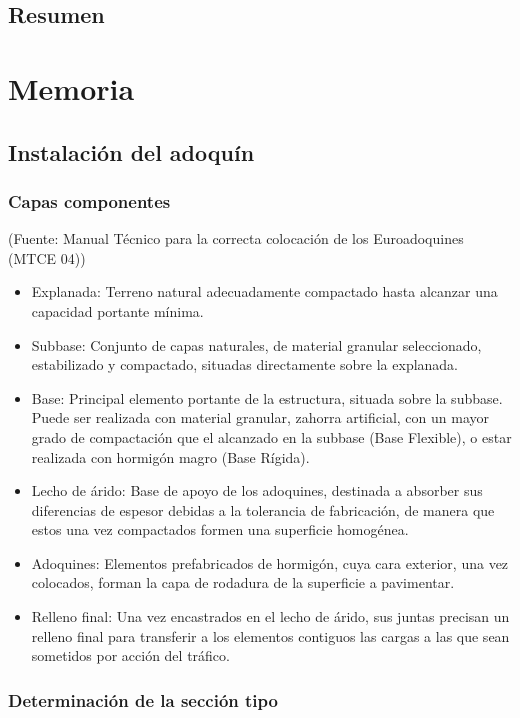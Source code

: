 \documentclass[12pt,titlepage,openright]{report}
\begin{document}
\newpage
\chapter*{Resumen}

\cleardoublepage
\part*{Memoria}

\chapter{Instalación del adoquín}
\section{Capas componentes}

(Fuente: Manual Técnico para la correcta colocación de los Euroadoquines (MTCE 04))

\begin{itemize}
\item Explanada: Terreno natural adecuadamente compactado hasta alcanzar una capacidad portante mínima.
\item Subbase: Conjunto de capas naturales, de material granular seleccionado, estabilizado y compactado, situadas directamente sobre la explanada.
\item Base: Principal elemento portante de la estructura, situada sobre la subbase. Puede ser realizada con material granular, zahorra artificial, con un mayor grado de compactación que el alcanzado en la subbase (Base Flexible), o estar realizada con hormigón magro (Base Rígida).
\item Lecho de árido: Base de apoyo de los adoquines, destinada a absorber sus diferencias de espesor debidas a la tolerancia de fabricación, de manera que estos una vez compactados formen una superficie homogénea.
\item Adoquines: Elementos prefabricados de hormigón, cuya cara exterior, una vez colocados, forman la capa de rodadura de la superficie a pavimentar.
\item Relleno final: Una vez encastrados en el lecho de árido, sus juntas precisan un relleno final para transferir a los elementos contiguos las cargas a las que sean sometidos por acción del tráfico.
\end{itemize}

\section{Determinación de la sección tipo}\label{sec:secciontipo}
\end{document}
